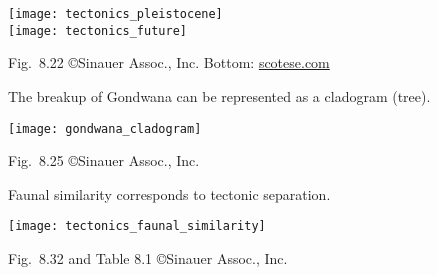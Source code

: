 \documentclass[t]{beamer}
\begin{document}
%
\begin{frame}[t]

	{\centering
	\texttt{[image: tectonics\_pleistocene]}\\[1ex]
	\texttt{[image: tectonics\_future]}\par
	}
	
	\vfilll
	
	\tiny Fig.~8.22 \copyright Sinauer Assoc., Inc. \hfill Bottom: \href{http://scotese.com}{scotese.com}
\end{frame}
%
%
%	
%	
%
\begin{frame}[t]{The breakup of Gondwana can be represented as a cladogram (tree).}

	\vspace*{-1\baselineskip}
	
	{\centering
	\texttt{[image: gondwana\_cladogram]}\par
	}
	
	\vfilll
	
	\tiny Fig.~8.25 \copyright Sinauer Assoc., Inc.
\end{frame}
%
\begin{frame}[t]{Faunal similarity corresponds to tectonic separation.}

	{\centering
	\texttt{[image: tectonics\_faunal\_similarity]}\par
	}
	
	\vfilll
	
	\hfill \tiny Fig.~8.32 and Table 8.1 \copyright Sinauer Assoc., Inc.
\end{frame}
%
\end{document}
